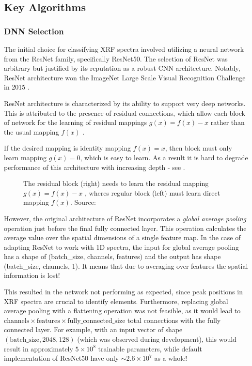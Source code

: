 \subsection{Key Algorithms}
\subsubsection{DNN Selection}

The initial choice for classifying XRF spectra involved utilizing a neural network from the ResNet family, specifically ResNet50. The selection of ResNet was arbitrary but justified by its reputation as a robust CNN architecture. Notably, ResNet architecture won the ImageNet Large Scale Visual Recognition Challenge in 2015 \cite{ImageNet2015}.

ResNet architecture is characterized by its ability to support very deep networks. This is attributed to the presence of residual connections, which allow each block of network for the learning of residual mappings $g(x) = f(x) - x$ rather than the usual mapping $f(x)$ \cite{d2lResnet}. 

If the desired mapping is identity mapping $f(x) = x$, then block must only learn mapping $g(x) = 0$, which is easy to learn. 
As a result it is hard to degrade performance of this architecture with increasing depth - see .

\begin{figure}[h] 
  \centering     
   
  \caption{ The residual block (right) needs to learn the residual mapping $g(x) = f(x) - x$ , wheres regular block (left) must learn direct mapping $f(x)$. Source: \cite{d2lResnet}}
  \label{fig:residual-block}
\end{figure}

However, the original architecture of ResNet incorporates a \emph{global average pooling} operation just before the final fully connected layer. 
This operation calculates the average value over the spatial dimensions of a single feature map. 
In the case of adapting ResNet to work with 1D spectra, the input for global average pooling has a shape of (batch\_size, channels, features) and the output has shape (batch\_size, channels, 1). 
It means that due to averaging over features the spatial information is lost!

This resulted in the network not performing as expected, since peak positions in XRF spectra are crucial to identify elements. 
Furthermore, replacing global average pooling with a flattening operation was not feasible, as it would lead to \\ $\text{{channels}} \times \text{{features}} \times \text{{fully\_connected\_size}}$ total connections with the fully connected layer. 
For example, with an input vector of shape $(\text{{batch\_size}}, 2048, 128)$ (which was observed during development), this would result in approximately $5 \times 10^{8}$ trainable parameters, while default implementation of ResNet50 have only $\sim2.6 \times 10^7$ as a whole!

